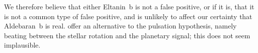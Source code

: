 \documentclass[modern]{aastex61}
\begin{document}
We therefore believe that either Eltanin~b is not a false positive, or if it is, that it is not a common type of false positive, and is unlikely to affect our certainty that Aldebaran~b is real. \citet{2018arXiv180105239H} offer an alternative to the pulsation hypothesis, namely beating between the stellar rotation and the planetary signal; this does not seem implausible.



\end{document}
